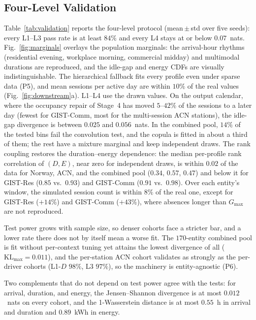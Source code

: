 \documentclass[journal]{IEEEtran}
\begin{document}
\subsection{Four-Level Validation}
\label{subsec:validation-results}

Table~\ref{tab:validation} reports the four-level protocol (mean\,$\pm$\,std over five seeds): every L1--L3 pass rate is at least $84\%$ and every L4 stays at or below $0.07$~nats. Fig.~\ref{fig:marginals} overlays the population marginals: the arrival-hour rhythms (residential evening, workplace morning, commercial midday) and multimodal durations are reproduced, and the idle-gap and energy CDFs are visually indistinguishable. The hierarchical fallback fits every profile even under sparse data (P5), and mean sessions per active day are within $10\%$ of the real values (Fig.~\ref{fig:downstream}a).
L1--L4 use the drawn values. On the output calendar, where the occupancy repair of Stage~4 has moved $5$--$42\%$ of the sessions to a later day (fewest for GIST-Comm, most for the multi-session ACN stations), the idle-gap divergence is between $0.025$ and $0.056$~nats. In the combined pool, $14\%$ of the tested bins fail the convolution test, and the copula is fitted in about a third of them; the rest have a mixture marginal and keep independent draws. The rank coupling restores the duration--energy dependence: the median per-profile rank correlation of $(D, E)$, near zero for independent draws, is within $0.02$ of the data for Norway, ACN, and the combined pool ($0.34$, $0.57$, $0.47$) and below it for GIST-Res ($0.85$ vs.\ $0.93$) and GIST-Comm ($0.91$ vs.\ $0.98$). Over each entity's window, the simulated session count is within $8\%$ of the real one, except for GIST-Res ($+14\%$) and GIST-Comm ($+43\%$), where absences longer than $G_{\max}$ are not reproduced.


Test power grows with sample size, so denser cohorts face a stricter bar, and a lower rate there does not by itself mean a worse fit. The $170$-entity combined pool is fit without per-context tuning yet attains the lowest divergence of all ($\mathrm{KL}_{\max}=0.011$), and the per-station ACN cohort validates as strongly as the per-driver cohorts (L1-$D$ $98\%$, L3 $97\%$), so the machinery is entity-agnostic (P6).


Two complements that do not depend on test power agree with the tests: for arrival, duration, and energy, the Jensen--Shannon divergence is at most $0.012$~nats on every cohort, and the 1-Wasserstein distance is at most $0.55$~h in arrival and duration and $0.89$~kWh in energy.
\end{document}
